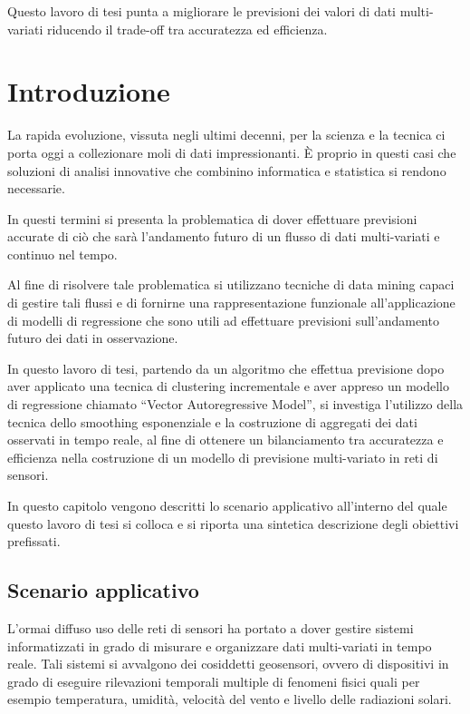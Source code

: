 \documentclass[12pt,a4paper,twoside,openright]{book}
\newcommand{\fncyblank}{\fancyhf{}}
\newenvironment{abstract}%
{\cleardoublepage\fncyblank\null \vfill\begin{center}%
\bfseries \abstractname \end{center}}%
{\vfill\null}
\begin{document}
\begin{abstract}
Questo lavoro di tesi punta a migliorare le previsioni dei valori di dati multi-variati riducendo il trade-off tra accuratezza ed efficienza. 
\end{abstract}
\tableofcontents
\listoffigures

\chapter{Introduzione}
La rapida evoluzione, vissuta negli ultimi decenni, per la scienza e la tecnica ci porta oggi  a collezionare moli di dati impressionanti. È proprio in questi casi che soluzioni di analisi innovative che combinino informatica e statistica si rendono necessarie. 

In questi termini si presenta la problematica di dover effettuare previsioni accurate di ciò che sarà l’andamento futuro di un flusso di dati multi-variati e continuo nel tempo.

Al fine di risolvere tale problematica si utilizzano tecniche di data mining capaci di gestire tali flussi e di fornirne una rappresentazione funzionale all’applicazione di modelli di regressione che sono utili ad effettuare previsioni sull’andamento futuro dei dati in osservazione. 

In questo lavoro di tesi, partendo da un algoritmo che effettua previsione dopo aver applicato una tecnica di clustering incrementale e aver appreso un modello di regressione chiamato “Vector Autoregressive Model”, si investiga l’utilizzo della tecnica dello smoothing esponenziale e la costruzione di aggregati dei dati osservati in tempo reale, al fine di ottenere un bilanciamento tra accuratezza e efficienza nella costruzione di un modello di previsione multi-variato in reti di sensori.



In questo capitolo vengono descritti lo scenario applicativo all’interno del quale questo lavoro di tesi si colloca e si riporta una sintetica descrizione degli obiettivi prefissati. 
\newpage
\section{Scenario applicativo}
L’ormai diffuso uso delle reti di sensori ha portato a dover gestire sistemi informatizzati in grado di misurare e organizzare dati multi-variati in tempo reale. Tali sistemi si avvalgono dei cosiddetti geosensori, ovvero di dispositivi in grado di eseguire rilevazioni temporali multiple di fenomeni fisici quali per esempio temperatura, umidità, velocità del vento e livello delle radiazioni solari. 
\end{document}
